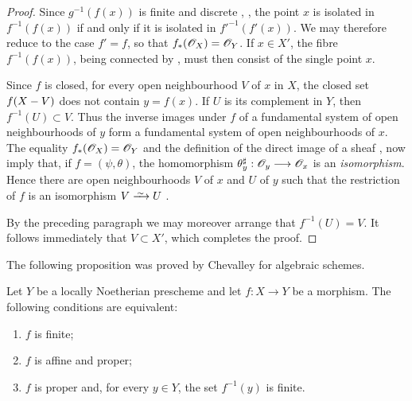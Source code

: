 \begin{proof}
Since $g^{-1}(f(x))$ is finite and discrete
, , the point $x$ is isolated in
$f^{-1}(f(x))$ if and only if it is isolated in
$f'^{-1}(f'(x))$.  We may therefore reduce to the case $f'=f$, so
that $f_*(\mathscr{O}_X)=\mathscr{O}_Y$.  If $x\in X'$, the fibre
$f^{-1}(f(x))$, being connected by , must then
consist of the single point $x$.

Since $f$ is closed, for every open neighbourhood $V$ of $x$ in
$X$, the closed set $f(X- V)$ does not contain $y=f(x)$.  If $U$ is
its complement in $Y$, then $f^{-1}(U)\subset V$.  Thus the inverse
images under $f$ of a fundamental system of open neighbourhoods of
$y$ form a fundamental system of open neighbourhoods of $x$.
The equality $f_*(\mathscr{O}_X)=\mathscr{O}_Y$ and the definition of the
direct image of a sheaf ,  now
imply that, if $f=(\psi,\theta)$, the homomorphism $\theta_y^\sharp:\mathscr{O}_y\longrightarrow\mathscr{O}_x$
is an \emph{isomorphism}.  Hence there are open neighbourhoods $V$ of $x$
and $U$ of $y$ such that the restriction of $f$ is an isomorphism
$V\isoto U$ .


By the preceding paragraph we may moreover arrange that
$f^{-1}(U)=V$.  It follows immediately that $V\subset X'$, which
completes the proof.
\end{proof}

The following proposition was proved by Chevalley for algebraic
schemes.

\begin{proposition}[4.4.2]
\label{III.4.4.2}
Let $Y$ be a locally Noetherian prescheme and let $f:X\to Y$ be a
morphism.  The following conditions are equivalent:
\begin{enumerate}
  \item[{\rm a)}] $f$ is finite;
  \item[{\rm b)}] $f$ is affine and proper;
  \item[{\rm c)}] $f$ is proper and, for every $y\in Y$, the set
    $f^{-1}(y)$ is finite.
\end{enumerate}
\end{proposition}

